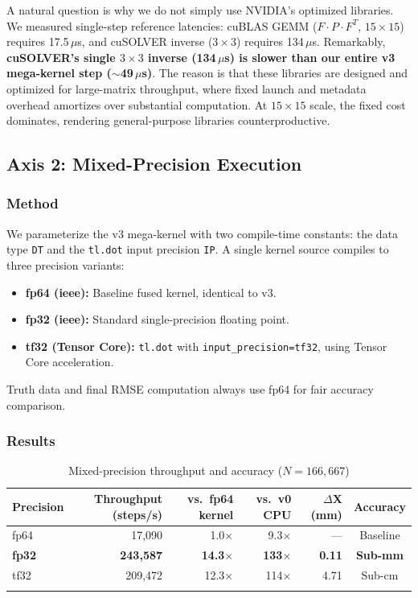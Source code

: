 \documentclass[pdflatex,sn-mathphys-num]{sn-jnl}%
\theoremstyle{thmstyleone}%
\theoremstyle{thmstyletwo}%
\theoremstyle{thmstylethree}%
\begin{document}
A natural question is why we do not simply use NVIDIA's optimized libraries. We measured single-step reference latencies: cuBLAS GEMM ($F \cdot P \cdot F^T$, $15\times15$) requires 17.5\,$\mu$s, and cuSOLVER inverse ($3\times3$) requires 134\,$\mu$s. Remarkably, \textbf{cuSOLVER's single $3\times3$ inverse (134\,$\mu$s) is slower than our entire v3 mega-kernel step ($\sim$49\,$\mu$s)}. The reason is that these libraries are designed and optimized for large-matrix throughput, where fixed launch and metadata overhead amortizes over substantial computation. At $15\times15$ scale, the fixed cost dominates, rendering general-purpose libraries counterproductive.

\subsection{Axis 2: Mixed-Precision Execution}\label{subsec:mixed_precision}

\subsubsection{Method}

We parameterize the v3 mega-kernel with two compile-time constants: the data type \texttt{DT} and the \texttt{tl.dot} input precision \texttt{IP}. A single kernel source compiles to three precision variants:

\begin{itemize}
\item \textbf{fp64 (ieee):} Baseline fused kernel, identical to v3.
\item \textbf{fp32 (ieee):} Standard single-precision floating point.
\item \textbf{tf32 (Tensor Core):} \texttt{tl.dot} with \texttt{input\_precision=tf32}, using Tensor Core acceleration.
\end{itemize}

Truth data and final RMSE computation always use fp64 for fair accuracy comparison.

\subsubsection{Results}

\begin{table}[h]
\caption{Mixed-precision throughput and accuracy ($N=166{,}667$)}\label{tab:precision}
\begin{tabular}{@{}lrrrrc@{}}
\toprule
Precision & Throughput (steps/s) & vs.~fp64 kernel & vs.~v0 CPU & $\Delta$X (mm) & Accuracy \\
\midrule
fp64 & 17,090 & 1.0$\times$ & 9.3$\times$ & --- & Baseline \\
\textbf{fp32} & \textbf{243,587} & \textbf{14.3$\times$} & \textbf{133$\times$} & \textbf{0.11} & \textbf{Sub-mm} \\
tf32 & 209,472 & 12.3$\times$ & 114$\times$ & 4.71 & Sub-cm \\
\botrule
\end{tabular}
\end{table}
\end{document}
